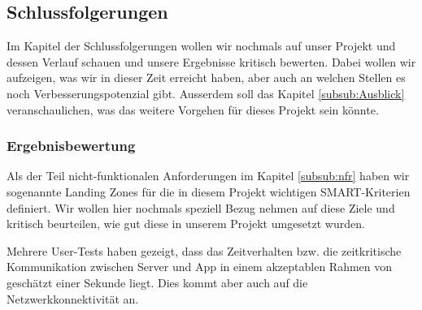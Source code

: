 \subsection{Schlussfolgerungen}
Im Kapitel der Schlussfolgerungen wollen wir nochmals auf unser Projekt und dessen Verlauf schauen und unsere Ergebnisse kritisch bewerten. Dabei wollen wir aufzeigen, was wir in dieser Zeit erreicht haben, aber auch an welchen Stellen es noch Verbesserungspotenzial gibt. Ausserdem soll das Kapitel \ref{subsub:Ausblick} veranschaulichen, was das weitere Vorgehen für dieses Projekt sein könnte.

\subsubsection{Ergebnisbewertung}
\label{subsec:ergebnisbewertung}


Als der Teil nicht-funktionalen Anforderungen im Kapitel \ref{subsub:nfr} haben wir sogenannte Landing Zones für die in diesem Projekt wichtigen SMART-Kriterien definiert. Wir wollen hier nochmals speziell Bezug nehmen auf diese Ziele und kritisch beurteilen, wie gut diese in unserem Projekt umgesetzt wurden.
 
 Mehrere User-Tests haben gezeigt, dass das Zeitverhalten bzw. die zeitkritische Kommunikation zwischen Server und App in einem akzeptablen Rahmen von geschätzt einer Sekunde liegt. Dies kommt aber auch auf die Netzwerkkonnektivität an. 
 
